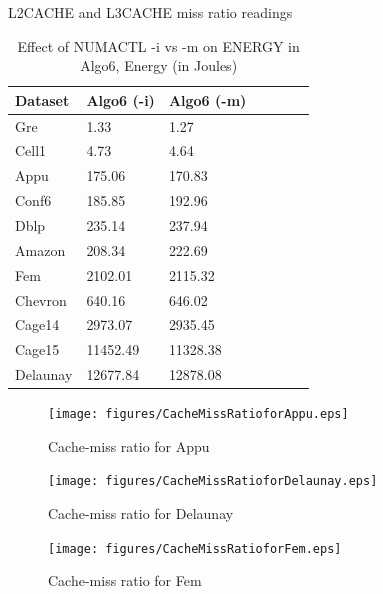 \begin{table}[th]
\caption{\capfont L2CACHE and L3CACHE miss ratio readings }
\label{tab:Table6}
\end{table}

\begin{table}[th]
\begin{center}
    \begin{tabular}{| l | l | l | l | l | l | l |}
    \hline
	Dataset &  Algo6 (-i) & Algo6 (-m)\\ \hline
    \hline
	Gre & 1.33 &  \cellcolor{green!25}1.27\\ \hline
	Cell1 & 4.73 & \cellcolor{green!25}4.64\\ \hline
	Appu & 175.06 & \cellcolor{green!25}170.83\\ \hline
	Conf6 & \cellcolor{green!25}185.85 & 192.96 \\ \hline
	Dblp & \cellcolor{green!25}235.14 & 237.94\\ \hline
	Amazon & \cellcolor{green!25}208.34 & 222.69\\ \hline
	Fem & \cellcolor{green!25}2102.01 & 2115.32\\ \hline
	Chevron & \cellcolor{green!25}640.16 & 646.02\\ \hline
	Cage14 & 2973.07 & \cellcolor{green!25}2935.45\\ \hline
	Cage15 & 11452.49 & \cellcolor{green!25}11328.38\\ \hline
	Delaunay & \cellcolor{green!25}12677.84 & 12878.08\\ \hline
    \end{tabular}
\end{center}
\caption{\capfont Effect of NUMACTL -i vs -m on ENERGY in Algo6,
Energy (in Joules)}
\label{tab:Table7}
\end{table}

\begin{figure}[t]
    \centering
    \texttt{[image: figures/CacheMissRatioforAppu.eps]}
    \caption{Cache-miss ratio for Appu}
    \label{fig:Appu-Cache Miss}
\end{figure}

\begin{figure}[t]
    \centering
    \texttt{[image: figures/CacheMissRatioforDelaunay.eps]}
    \caption{Cache-miss ratio for Delaunay}
    \label{fig:Delaunay-Cache Miss}
\end{figure}

\begin{figure}[t]
    \centering
    \texttt{[image: figures/CacheMissRatioforFem.eps]}
    \caption{Cache-miss ratio for Fem}
    \label{fig:Fem-Cache Miss}
\end{figure}

